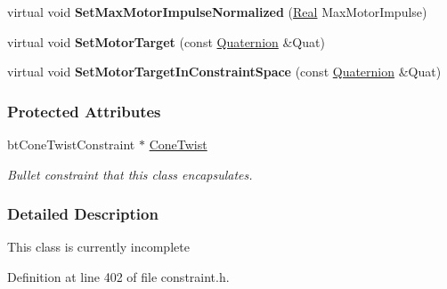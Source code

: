 \begin{DoxyCompactItemize}
\item 
\hypertarget{classMezzanine_1_1ConeTwistConstraint_aaa80fb80e821863266a5db5842978ae7}{
virtual void {\bfseries SetMaxMotorImpulseNormalized} (\hyperlink{namespaceMezzanine_a726731b1a7df72bf3583e4a97282c6f6}{Real} MaxMotorImpulse)}
\label{classMezzanine_1_1ConeTwistConstraint_aaa80fb80e821863266a5db5842978ae7}

\item 
\hypertarget{classMezzanine_1_1ConeTwistConstraint_ad831add9b4879c3f3a174ec5f03908f0}{
virtual void {\bfseries SetMotorTarget} (const \hyperlink{classMezzanine_1_1Quaternion}{Quaternion} \&Quat)}
\label{classMezzanine_1_1ConeTwistConstraint_ad831add9b4879c3f3a174ec5f03908f0}

\item 
\hypertarget{classMezzanine_1_1ConeTwistConstraint_a846d9d18b94603b3fcc8fb83510d4510}{
virtual void {\bfseries SetMotorTargetInConstraintSpace} (const \hyperlink{classMezzanine_1_1Quaternion}{Quaternion} \&Quat)}
\label{classMezzanine_1_1ConeTwistConstraint_a846d9d18b94603b3fcc8fb83510d4510}

\end{DoxyCompactItemize}
\subsubsection*{Protected Attributes}
\begin{DoxyCompactItemize}
\item 
\hypertarget{classMezzanine_1_1ConeTwistConstraint_a7920115fb30ebd57046b1966f5e61068}{
btConeTwistConstraint $\ast$ \hyperlink{classMezzanine_1_1ConeTwistConstraint_a7920115fb30ebd57046b1966f5e61068}{ConeTwist}}
\label{classMezzanine_1_1ConeTwistConstraint_a7920115fb30ebd57046b1966f5e61068}

\begin{DoxyCompactList}\small\item\em Bullet constraint that this class encapsulates. \item\end{DoxyCompactList}\end{DoxyCompactItemize}


\subsubsection{Detailed Description}
This class is currently incomplete 

Definition at line 402 of file constraint.h.



